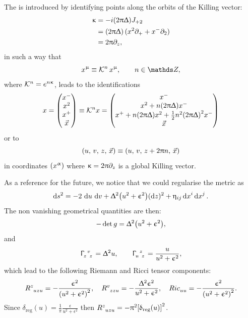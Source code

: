 The \nbo is introduced by identifying points along the orbits of the Killing vector:
\begin{equation}
  \begin{split}
    \upkappa
    & =
    - i \qty(2 \uppi \Updelta) J_{+2}
    \\
    & =
    \qty(2 \uppi \Updelta)\, (x^2 \partial_{+} + x^- \partial_{2})
    \\
    & =
    2 \uppi \partial_{z},
  \end{split}
  \label{eq:nbo_killing_vector}
\end{equation}
in such a way that
\begin{equation}
  x^{\mu} \equiv \cK^{n}\, x^{\mu},
  \qquad
  n \in \Z,
\end{equation}
where $\mathcal{K}^{n}= e^{n\upkappa}$, leads to the identifications
\begin{equation}
  x=
  \mqty( x^- \\  x^2 \\ x^+ \\ \vec{x} )
  \equiv
  \cK^{n} x
  =
  \mqty(%
    x^- \\
    x^2 + n \qty(2 \pi \Delta) x^- \\
    x^+ + n \qty(2 \pi \Delta) x^2 + \frac{1}{2} n^2 \qty(2 \pi \Delta)^2 x^- \\
   \vec{x}
  )
\end{equation}
or to 
\begin{equation}
  \qty( u,\, v,\, z,\, \vec{x} )
  \equiv
  \qty( u,\, v,\, z + 2 \uppi n,\, \vec{x} )
\end{equation}
in coordinates $\qty(x^{\upalpha})$ where $\upkappa = 2 \uppi \partial_{z}$ is a global Killing vector.

As a reference for the future, we notice that we could regularise the metric as
\begin{equation}
  \dss[2]{s}
  =
  - 2\, \dd{u}\, \dd{v}
  + \Delta^2 \qty(u^2 + \epsilon^2) (\dd{z})^2
  + \eta_{ij} \dd{x}^i \dd{x}^j.
\end{equation}
The non vanishing geometrical quantities are then:
\begin{equation}
  -\det g = \Updelta^2 \qty(u^2 + \upepsilon^2),
\end{equation}
and
\begin{equation}
  \tensor{\Gamma}{_z^v_z} = \Delta^2 u,
  \qquad
  \tensor{\Gamma}{_u^z_z} = \frac{u}{u^2 + \epsilon^2},
\end{equation}
which lead to the following Riemann and Ricci tensor components:
\begin{equation}
  \tensor{R}{^z_u_z_u} = - \frac{\epsilon^2}{\qty(u^2+ \epsilon^2)^2},
  \quad
  \tensor{R}{^v_z_z_u} = - \frac{\Delta^2 \epsilon^2}{u^2 + \epsilon^2},
  \quad
  \tensor{Ric}{_u_u} = -\frac{\epsilon^2}{\qty(u^2+ \epsilon^2)^2}.
\end{equation}
Since $\delta_{\text{reg}}(u) = \frac{1}{\pi} \frac{\epsilon}{u^2+ \epsilon^2}$ then $\tensor{R}{^z_u_z_u} = - \pi^2 \qty[ \delta_{\text{reg}}(u) ]^2$.


